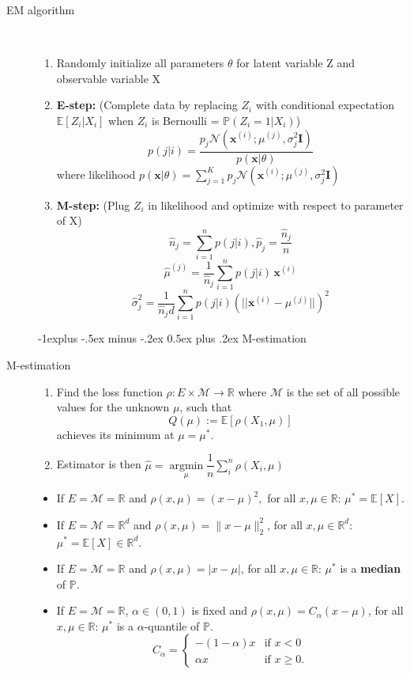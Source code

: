 \documentclass[a4paper, 10pt,landscape]{article}
\makeatletter
\DeclareMathOperator*{\argmin}{argmin}
\renewcommand{\subsection}{\@startsection{subsection}{2}{0mm}%
                                {-1explus -.5ex minus -.2ex}%
                                {0.5ex plus .2ex}%
                                {\normalfont\normalsize\bfseries}}
\makeatother
\begin{document}
\begin{multicols*}{4}
\begin{description}
	\item[EM algorithm]~
		\begin{enumerate}
		\item[] Randomly initialize all parameters $\theta$ for latent variable Z and observable variable X
		\item {\bf E-step:} (Complete data by replacing $Z_i$ with conditional expectation  $\mathbb{E}[Z_i|X_i]$ when $Z_i$ is Bernoulli = $\mathbb{P}(Z_i=1|X_i)$)
			$$p(j|i)=\dfrac{p_j\mathcal{N}\left(\mathbf{x}^{(i)};\mu^{(j)},\sigma^2_j\mathbf{I}\right)}{p\left(\mathbf{x}|\theta\right)}$$
			where likelihood $p(\mathbf{x}|\theta)=\sum\limits_{j=1}^{K}p_j\mathcal{N}\left(\mathbf{x}^{(i)};\mu^{(j)},\sigma^2_j\mathbf{I}\right)$
		\item {\bf M-step:} (Plug $Z_i$ in likelihood and optimize with respect to parameter of X)
			$$\widehat{n}_j=\sum_{i=1}^{n}p(j|i), \widehat{p}_j=\dfrac{\widehat{n}_j}{n}$$
			$$\widehat{\mu}^{(j)}=\dfrac{1}{\widehat{n}_j}\sum_{i=1}^{n}p(j|i)\,\mathbf{x}^{(i)}$$
			$$\widehat{\sigma}^2_j=\dfrac{1}{\widehat{n}_jd}\sum_{i=1}^{n}p(j|i) (||\mathbf{x}^{(i)}-\mu^{(j)} ||)^2$$
		\end{enumerate}

\subsection{M-estimation}
	\item[M-estimation]
		\begin{enumerate}
			
			\item Find the loss function $\rho:E\times\mathcal{M}\rightarrow\mathbb{R}$  where $\mathcal{M}$ is the set of all possible values for the unknown $\mu$, such that $$Q(\mu):=\mathbb{E}\left[\rho\left(X_1,\mu\right)\right]$$ achieves its minimum at $\mu=\mu^*$.
			\item Estimator is then $\widehat{\mu}=\argmin\limits_{\mu}\dfrac{1}{n} \sum_i^n \rho(X_i, \mu)$
		\end{enumerate}

		\begin{itemize}
		\item If $E=\mathcal{M}=\mathbb{R}$ and $\rho(x,\mu)=(x-\mu)^2,$ for all $x,\mu\in\mathbb{R}$: $\mu^*=\mathbb{E}\left[X\right]$.
		\item If $E=\mathcal{M}=\mathbb{R}^d$ and $\rho(x,\mu)=\lVert x-\mu\rVert_2^2$, for all $x,\mu\in\mathbb{R}^d$: $\mu^*=\mathbb{E}\left[X\right]\in\mathbb{R}^d$.
		\item If $E=\mathcal{M}=\mathbb{R}$ and $\rho(x,\mu)=|x-\mu|$, for all $x,\mu\in\mathbb{R}$: $\mu^*$ is a {\bf median} of $\mathbb{P}$.
		\item If $E=\mathcal{M}=\mathbb{R}$, $\alpha\in(0,1)$ is fixed and $\rho(x,\mu)=C_\alpha(x-\mu)$, for all $x,\mu\in\mathbb{R}$: $\mu^*$ is a $\alpha$-quantile of $\mathbb{P}$.
			$$C_\alpha=\begin{cases}
			-(1-\alpha)x&\text{if }x<0\\
			\alpha x&\text{if }x\geq0.
			\end{cases}$$
		\end{itemize}


\end{description}
\end{multicols*}
\end{document}
